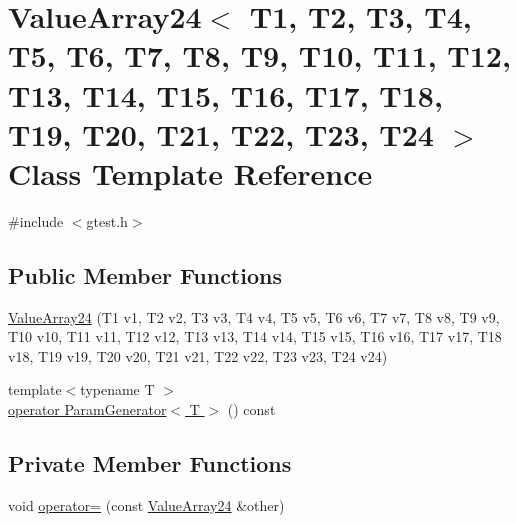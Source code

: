 \hypertarget{classtesting_1_1internal_1_1ValueArray24}{\section{\-Value\-Array24$<$ \-T1, \-T2, \-T3, \-T4, \-T5, \-T6, \-T7, \-T8, \-T9, \-T10, \-T11, \-T12, \-T13, \-T14, \-T15, \-T16, \-T17, \-T18, \-T19, \-T20, \-T21, \-T22, \-T23, \-T24 $>$ \-Class \-Template \-Reference}
\label{d0/da4/classtesting_1_1internal_1_1ValueArray24}
}


{\ttfamily \#include $<$gtest.\-h$>$}

\subsection*{\-Public \-Member \-Functions}
\begin{DoxyCompactItemize}
\item 
\hyperlink{classtesting_1_1internal_1_1ValueArray24_aa81bb6b1ebb8696bf502c36e049fac36}{\-Value\-Array24} (\-T1 v1, \-T2 v2, \-T3 v3, \-T4 v4, \-T5 v5, \-T6 v6, \-T7 v7, \-T8 v8, \-T9 v9, \-T10 v10, \-T11 v11, \-T12 v12, \-T13 v13, \-T14 v14, \-T15 v15, \-T16 v16, \-T17 v17, \-T18 v18, \-T19 v19, \-T20 v20, \-T21 v21, \-T22 v22, \-T23 v23, \-T24 v24)
\item 
{\footnotesize template$<$typename T $>$ }\\\hyperlink{classtesting_1_1internal_1_1ValueArray24_a08ef46fa12c9dd8ef6fc630baeea89b7}{operator Param\-Generator$<$ T $>$} () const 
\end{DoxyCompactItemize}
\subsection*{\-Private \-Member \-Functions}
\begin{DoxyCompactItemize}
\item 
void \hyperlink{classtesting_1_1internal_1_1ValueArray24_ad9908489377f00448a4d6545e3db808d}{operator=} (const \hyperlink{classtesting_1_1internal_1_1ValueArray24}{\-Value\-Array24} \&other)
\end{DoxyCompactItemize}
